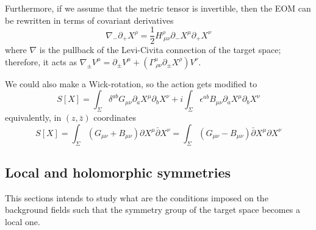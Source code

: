 \documentclass[a4paper,12pt]{article}
\numberwithin{equation}{section}
\numberwithin{thm}{section}
\numberwithin{exm}{section}
\newcommand{\p}{\partial}
\newcommand{\pb}{\bar\partial}
\newcommand{\<}{{\langle}}
\renewcommand{\>}{{\rangle}}
\renewcommand{\d}{{\delta}}
\newcommand{\e}{{\epsilon}}
\newcommand{\m}{{\mu}}
\newcommand{\n}{{\nu}}
\renewcommand{\S}{{\Sigma}}
\begin{document}
Furthermore, if we assume that the metric tensor is invertible, then the EOM can be rewritten in terms of covariant derivatives
	\begin{equation}
	\nabla_-\p_+X^\rho=\frac{1}{2}H^\rho_{\ \mu\nu}\p_-X^\mu\p_+X^\nu
	\end{equation}
where $\nabla$ is the pullback of the Levi-Civita connection of the target space; therefore, it acts as $\nabla_\pm V^\mu=\p_\pm V^\mu+(\Gamma^\mu_{\ \rho\nu}\p_\pm X^\rho)V^\nu$.

We could also make a Wick-rotation, so the action gets modified to
	\begin{equation}
	S[X] = \int_\S \d^{ab}G_{\m\n}\p_a X^\m \p_b X^\n + i\int_\S \e^{ab} B_{\m\n} \p_a X^\m \p_b X^\n
	\end{equation}
equivalently, in $(z,\bar z)$ coordinates
	\begin{equation}
	S[X] = \int_\S (G_{\m\n} + B_{\m\n})\p X^\m \pb X^\n = \int_\S (G_{\m\n} - B_{\m\n})\pb X^\m \p X^\n
	\end{equation}


\subsection{Local and holomorphic symmetries}
This sections intends to study what are the conditions imposed on the background fields such that the symmetry group of the target space becomes a local one.
\end{document}
